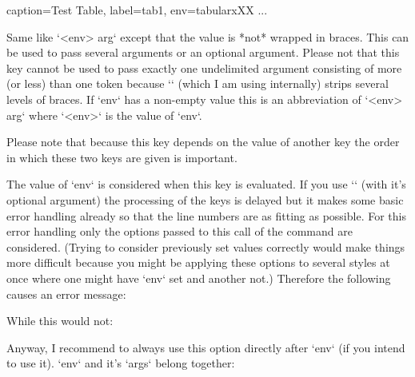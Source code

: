   \begin{examplecode}

  \begin{tableobject}{caption=Test Table, label=tab1, env=tabularx}{XX}
      ...
  \end{tableobject}
  \end{examplecode}

  Same like `<env> arg` except that the value is *not* wrapped in braces.
  This can be used to pass several arguments or an optional argument.
  Please not that this key cannot be used to pass exactly one undelimited argument consisting of more (or less) than one token because `\pgfkeys` (which I am using internally) strips several levels of braces.
  If `env` has a non-empty value this is an abbreviation of `<env> arg` where `<env>` is the value of `env`.

  Please note that because this key depends on the value of another key the order in which these two keys are given is important.

  The value of `env` is considered when this key is evaluated.
  If you use `` (with it's optional argument) the processing of the keys is delayed but it makes some basic error handling already so that the line numbers are as fitting as possible.
  For this error handling only the options passed to this call of the command are considered.
  (Trying to consider previously set values correctly would make things more difficult because you might be applying these options to several styles at once where one might have `env` set and another not.)
  Therefore the following causes an error message:

  \begin{examplecode}
  \end{examplecode}

  While this would not:

  \begin{examplecode}
  \end{examplecode}

  Anyway, I recommend to always use this option directly after `env` (if you intend to use it).
  `env` and it's `args` belong together:

